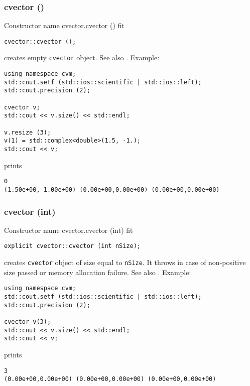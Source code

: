 \subsubsection{cvector ()}
Constructor%
\pdfdest name {cvector.cvector ()} fit
\begin{verbatim}
cvector::cvector ();
\end{verbatim}
creates  empty \verb"cvector" object.
See also .
Example:
\begin{Verbatim}
using namespace cvm;
std::cout.setf (std::ios::scientific | std::ios::left);
std::cout.precision (2);

cvector v;
std::cout << v.size() << std::endl;

v.resize (3);
v(1) = std::complex<double>(1.5, -1.);
std::cout << v;
\end{Verbatim}
prints
\begin{Verbatim}
0
(1.50e+00,-1.00e+00) (0.00e+00,0.00e+00) (0.00e+00,0.00e+00)
\end{Verbatim}
\newpage


\subsubsection{cvector (int)}
Constructor%
\pdfdest name {cvector.cvector (int)} fit
\begin{verbatim}
explicit cvector::cvector (int nSize);
\end{verbatim}
creates \verb"cvector" object of size equal to \verb"nSize".
It throws  
in case of non-positive size passed or memory allocation failure.
See also .
Example:
\begin{Verbatim}
using namespace cvm;
std::cout.setf (std::ios::scientific | std::ios::left);
std::cout.precision (2);

cvector v(3);
std::cout << v.size() << std::endl;
std::cout << v;
\end{Verbatim}
prints
\begin{Verbatim}
3
(0.00e+00,0.00e+00) (0.00e+00,0.00e+00) (0.00e+00,0.00e+00)
\end{Verbatim}
\newpage




